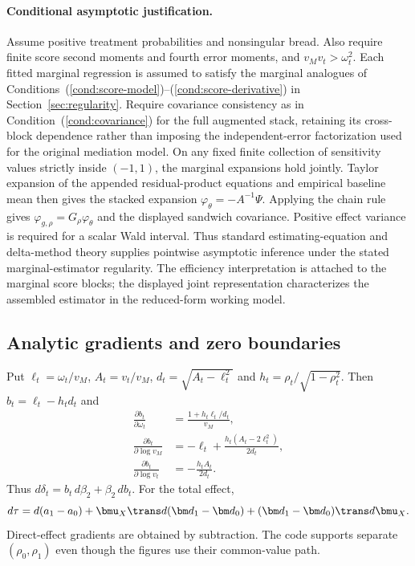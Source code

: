 \paragraph{Conditional asymptotic justification.}
Assume positive treatment probabilities and nonsingular bread. Also require finite score second moments and fourth error moments, and $v_Mv_t>\omega_t^2$. Each fitted marginal regression is assumed to satisfy the marginal analogues of Conditions~(\ref{cond:score-model})--(\ref{cond:score-derivative}) in Section~\ref{sec:regularity}. Require covariance consistency as in Condition~(\ref{cond:covariance}) for the full augmented stack, retaining its cross-block dependence rather than imposing the independent-error factorization used for the original mediation model. On any fixed finite collection of sensitivity values strictly inside $(-1,1)$, the marginal expansions hold jointly. Taylor expansion of the appended residual-product equations and empirical baseline mean then gives the stacked expansion $\varphi_\theta=-A^{-1}\Psi$. Applying the chain rule gives $\varphi_{g,\rho}=G_\rho\varphi_\theta$ and the displayed sandwich covariance. Positive effect variance is required for a scalar Wald interval. Thus standard estimating-equation and delta-method theory supplies pointwise asymptotic inference under the stated marginal-estimator regularity. The efficiency interpretation is attached to the marginal score blocks; the displayed joint representation characterizes the assembled estimator in the reduced-form working model.

\subsection{Analytic gradients and zero boundaries}

Put $\ell_t=\omega_t/v_M$, $A_t=v_t/v_M$, $d_t=\sqrt{A_t-\ell_t^2}$ and $h_t=\rho_t/\sqrt{1-\rho_t^2}$. Then $b_t=\ell_t-h_td_t$ and
\begin{align*}
\frac{\partial b_t}{\partial\omega_t}&=\frac{1+h_t\ell_t/d_t}{v_M},\\
\frac{\partial b_t}{\partial\log v_M}&=-\ell_t+\frac{h_t(A_t-2\ell_t^2)}{2d_t},\\
\frac{\partial b_t}{\partial\log v_t}&=-\frac{h_tA_t}{2d_t}.
\end{align*}
Thus $d\delta_t=b_t\,d\beta_2+\beta_2\,db_t$. For the total effect,
\[
d\tau=d(a_1-a_0)+\bmu_X\trans d(\bm d_1-\bm d_0)
+(\bm d_1-\bm d_0)\trans d\bmu_X.
\]
Direct-effect gradients are obtained by subtraction. The code supports separate $(\rho_0,\rho_1)$ even though the figures use their common-value path.

